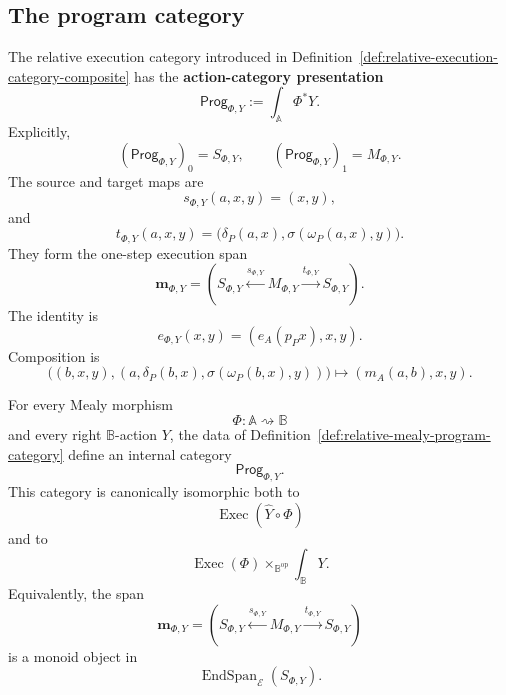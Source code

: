 \subsection{The program category}
\label{subsec:relative-program-category-definition}

\begin{definition}
\label{def:relative-mealy-program-category}
The relative execution category introduced in
Definition~\ref{def:relative-execution-category-composite} has the
\textbf{action-category presentation}
\[
\mathsf{Prog}_{\Phi,Y}
:=
\int_{\mathbb A}\Phi^\ast Y.
\]
Explicitly,
\[
(\mathsf{Prog}_{\Phi,Y})_0=S_{\Phi,Y},
\qquad
(\mathsf{Prog}_{\Phi,Y})_1=M_{\Phi,Y}.
\]
The source and target maps are
\[
s_{\Phi,Y}(a,x,y)=(x,y),
\]
and
\[
t_{\Phi,Y}(a,x,y)
=
\bigl(
\delta_P(a,x),
\sigma(\omega_P(a,x),y)
\bigr).
\]
They form the one-step execution span
\[
\mathbf m_{\Phi,Y}
=
\left(
S_{\Phi,Y}
\xleftarrow{s_{\Phi,Y}}
M_{\Phi,Y}
\xrightarrow{t_{\Phi,Y}}
S_{\Phi,Y}
\right).
\]
The identity is
\[
e_{\Phi,Y}(x,y)=(e_A(p_Px),x,y).
\]
Composition is
\[
\bigl(
(b,x,y),
(a,\delta_P(b,x),\sigma(\omega_P(b,x),y))
\bigr)
\longmapsto
(m_A(a,b),x,y).
\]
\end{definition}

\begin{theorem}
\label{thm:relative-program-categories}
For every Mealy morphism
\[
\Phi:\mathbb A\rightsquigarrow\mathbb B
\]
and every right \(\mathbb B\)-action \(Y\), the data of
Definition~\ref{def:relative-mealy-program-category} define an internal
category
\[
\mathsf{Prog}_{\Phi,Y}.
\]
This category is canonically isomorphic both to
\[
\operatorname{Exec}(\widehat Y\circ\Phi)
\]
and to
\[
\operatorname{Exec}(\Phi)
\times_{\mathbb B^{\mathrm{op}}}
\int_{\mathbb B}Y.
\]
Equivalently, the span
\[
\mathbf m_{\Phi,Y}
=
\left(
S_{\Phi,Y}
\xleftarrow{s_{\Phi,Y}}
M_{\Phi,Y}
\xrightarrow{t_{\Phi,Y}}
S_{\Phi,Y}
\right)
\]
is a monoid object in
\[
\operatorname{EndSpan}_{\mathcal E}(S_{\Phi,Y}).
\]
\end{theorem}

